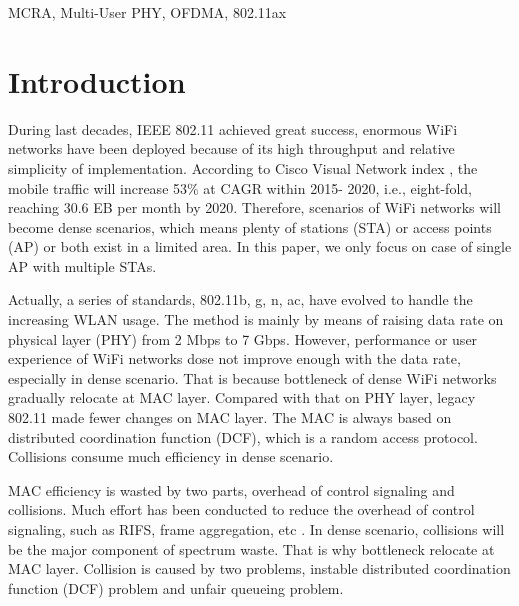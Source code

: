 \documentclass[journal]{IEEEtran}
\begin{document}
\begin{IEEEkeywords}
MCRA, Multi-User PHY, OFDMA, 802.11ax
\end{IEEEkeywords}






%
\IEEEpeerreviewmaketitle


\section{Introduction}		\label{Intro}

During last decades, IEEE 802.11 achieved great success, enormous WiFi networks have been deployed because of its high throughput and relative simplicity of implementation.
According to Cisco Visual Network index \cite{cisco2016}, the mobile traffic will increase 53\% at CAGR within 2015-
2020, i.e., eight-fold, reaching 30.6 EB per month by 2020.
Therefore, scenarios of WiFi networks will become dense scenarios, which means plenty of stations (STA) or access points (AP) or both exist in a limited area. 
In this paper, we only focus on case of single AP with multiple STAs. 

Actually, a series of standards, 802.11b, g, n, ac, have evolved to handle the increasing WLAN usage.
The method is mainly by means of raising data rate on physical layer (PHY) \cite{perahia2013next} from 2 Mbps to 7 Gbps.
However, performance or user experience of WiFi networks dose not improve enough with the data rate, especially in dense scenario. 
That is because bottleneck of dense WiFi networks gradually relocate at MAC layer.
Compared with that on PHY layer, legacy 802.11 made fewer changes on MAC layer. 
The MAC is always based on distributed coordination function (DCF), which is a random access protocol. 
Collisions consume much efficiency in dense scenario.

MAC efficiency is wasted by two parts, overhead of control signaling and collisions.
Much effort has been conducted to reduce the overhead of control signaling, such as RIFS, frame aggregation, etc \cite{perahia2013next}. 
In dense scenario, collisions will be the major component of spectrum waste.
That is why bottleneck relocate at MAC layer.
Collision is caused by two problems, instable distributed coordination function (DCF) problem and unfair queueing problem.
\end{document}
